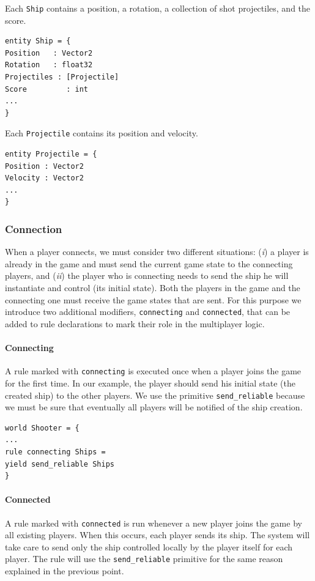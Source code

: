 Each \texttt{Ship} contains a position, a rotation, a collection of shot projectiles, and the score.
\begin{lstlisting}
entity Ship = {
Position   : Vector2
Rotation   : float32
Projectiles : [Projectile]
Score		  : int
...
}

\end{lstlisting}

Each \texttt{Projectile} contains its position and velocity.

\begin{lstlisting}
entity Projectile = {
Position : Vector2
Velocity : Vector2
...
}
\end{lstlisting}

\subsubsection{Connection}
When a player connects, we must consider two different situations: (\textit{i}) a player is already in the game and must send the current game state to the connecting players, and (\textit{ii}) the player who is connecting needs to send the ship he will instantiate and control (its initial state). Both the players in the game and the connecting one must receive the game states that are sent. For this purpose we introduce two additional modifiers, \texttt{connecting} and \texttt{connected}, that can be added to rule declarations to mark their role in the multiplayer logic.

\paragraph{Connecting} A rule marked with \texttt{connecting} is executed once when a player joins the game for the first time. In our example, the player should send his initial state (the created ship) to the other players. We use the primitive \texttt{send\_reliable} because we must be sure that eventually all players will be notified of the ship creation.
\begin{lstlisting}
world Shooter = {
...
rule connecting Ships =
yield send_reliable Ships
}
\end{lstlisting}

\paragraph{Connected} A rule marked with \texttt{connected} is run whenever a new player joins the game by all existing players. When this occurs, each player sends its ship. The system will take care to send only the ship controlled locally by the player itself for each player. The rule will use the \texttt{send\_reliable} primitive for the same reason explained in the previous point.

